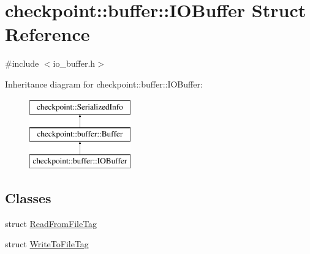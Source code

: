\hypertarget{structcheckpoint_1_1buffer_1_1_i_o_buffer}{}\section{checkpoint\+:\+:buffer\+:\+:I\+O\+Buffer Struct Reference}
\label{structcheckpoint_1_1buffer_1_1_i_o_buffer}


{\ttfamily \#include $<$io\+\_\+buffer.\+h$>$}

Inheritance diagram for checkpoint\+:\+:buffer\+:\+:I\+O\+Buffer\+:\begin{figure}[H]
\begin{center}
\leavevmode
\includegraphics[height=3.000000cm]{structcheckpoint_1_1buffer_1_1_i_o_buffer}
\end{center}
\end{figure}
\subsection*{Classes}
\begin{DoxyCompactItemize}
\item 
struct \hyperlink{structcheckpoint_1_1buffer_1_1_i_o_buffer_1_1_read_from_file_tag}{Read\+From\+File\+Tag}
\item 
struct \hyperlink{structcheckpoint_1_1buffer_1_1_i_o_buffer_1_1_write_to_file_tag}{Write\+To\+File\+Tag}
\end{DoxyCompactItemize}
